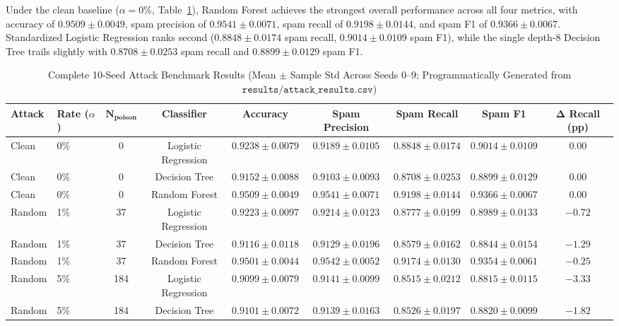 \documentclass[10pt,conference]{IEEEtran}
\begin{document}
Under the clean baseline ($\alpha = 0\%$, Table~\ref{tab:full_attack_results}), Random Forest achieves the strongest overall performance across all four metrics, with accuracy of $0.9509 \pm 0.0049$, spam precision of $0.9541 \pm 0.0071$, spam recall of $0.9198 \pm 0.0144$, and spam F1 of $0.9366 \pm 0.0067$. Standardized Logistic Regression ranks second ($0.8848 \pm 0.0174$ spam recall, $0.9014 \pm 0.0109$ spam F1), while the single depth-8 Decision Tree trails slightly with $0.8708 \pm 0.0253$ spam recall and $0.8899 \pm 0.0129$ spam F1.

\begin{table}[htbp]
\caption{Complete 10-Seed Attack Benchmark Results (Mean $\pm$ Sample Std Across Seeds 0--9; Programmatically Generated from $\mathtt{results/attack\_results.csv}$)}
\label{tab:full_attack_results}
\centering
\begin{tabular}{llccccccc}
\toprule
\textbf{Attack} & \textbf{Rate ($\alpha$)} & $\mathbf{N_{\text{poison}}}$ & \textbf{Classifier} & \textbf{Accuracy} & \textbf{Spam Precision} & \textbf{Spam Recall} & \textbf{Spam F1} & $\mathbf{\Delta}$ \textbf{Recall (pp)} \\
\midrule
Clean & 0\% & 0 & Logistic Regression & $0.9238 \pm 0.0079$ & $0.9189 \pm 0.0105$ & $0.8848 \pm 0.0174$ & $0.9014 \pm 0.0109$ & $0.00$ \\
Clean & 0\% & 0 & Decision Tree & $0.9152 \pm 0.0088$ & $0.9103 \pm 0.0093$ & $0.8708 \pm 0.0253$ & $0.8899 \pm 0.0129$ & $0.00$ \\
Clean & 0\% & 0 & Random Forest & $\mathbf{0.9509 \pm 0.0049}$ & $\mathbf{0.9541 \pm 0.0071}$ & $\mathbf{0.9198 \pm 0.0144}$ & $\mathbf{0.9366 \pm 0.0067}$ & $0.00$ \\
\midrule
Random & 1\% & 37 & Logistic Regression & $0.9223 \pm 0.0097$ & $0.9214 \pm 0.0123$ & $0.8777 \pm 0.0199$ & $0.8989 \pm 0.0133$ & $-0.72$ \\
Random & 1\% & 37 & Decision Tree & $0.9116 \pm 0.0118$ & $0.9129 \pm 0.0196$ & $0.8579 \pm 0.0162$ & $0.8844 \pm 0.0154$ & $-1.29$ \\
Random & 1\% & 37 & Random Forest & $0.9501 \pm 0.0044$ & $0.9542 \pm 0.0052$ & $0.9174 \pm 0.0130$ & $0.9354 \pm 0.0061$ & $-0.25$ \\
Random & 5\% & 184 & Logistic Regression & $0.9099 \pm 0.0079$ & $0.9141 \pm 0.0099$ & $0.8515 \pm 0.0212$ & $0.8815 \pm 0.0115$ & $-3.33$ \\
Random & 5\% & 184 & Decision Tree & $0.9101 \pm 0.0072$ & $0.9139 \pm 0.0163$ & $0.8526 \pm 0.0197$ & $0.8820 \pm 0.0099$ & $-1.82$ \\

\end{tabular}
\end{table}
\end{document}
